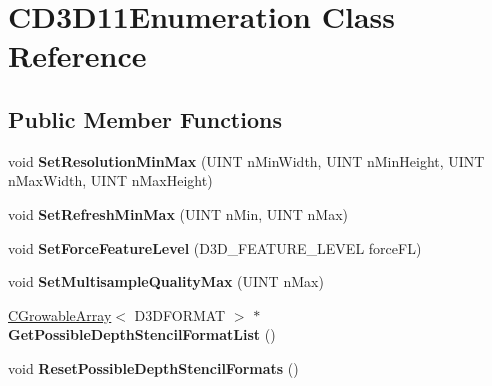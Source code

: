 \hypertarget{class_c_d3_d11_enumeration}{\section{C\+D3\+D11\+Enumeration Class Reference}
\label{class_c_d3_d11_enumeration}
}
\subsection*{Public Member Functions}
\begin{DoxyCompactItemize}
\item 
\hypertarget{class_c_d3_d11_enumeration_ac09ed1a218f19ee3147e2206e760ab58}{void {\bfseries Set\+Resolution\+Min\+Max} (U\+I\+N\+T n\+Min\+Width, U\+I\+N\+T n\+Min\+Height, U\+I\+N\+T n\+Max\+Width, U\+I\+N\+T n\+Max\+Height)}\label{class_c_d3_d11_enumeration_ac09ed1a218f19ee3147e2206e760ab58}

\item 
\hypertarget{class_c_d3_d11_enumeration_a17f92827af1e4632a2cf69c6697522d5}{void {\bfseries Set\+Refresh\+Min\+Max} (U\+I\+N\+T n\+Min, U\+I\+N\+T n\+Max)}\label{class_c_d3_d11_enumeration_a17f92827af1e4632a2cf69c6697522d5}

\item 
\hypertarget{class_c_d3_d11_enumeration_a9a63b7dac5d73edb7c695fb93c305730}{void {\bfseries Set\+Force\+Feature\+Level} (D3\+D\+\_\+\+F\+E\+A\+T\+U\+R\+E\+\_\+\+L\+E\+V\+E\+L force\+F\+L)}\label{class_c_d3_d11_enumeration_a9a63b7dac5d73edb7c695fb93c305730}

\item 
\hypertarget{class_c_d3_d11_enumeration_a193b533444d3877edb73e2648f331858}{void {\bfseries Set\+Multisample\+Quality\+Max} (U\+I\+N\+T n\+Max)}\label{class_c_d3_d11_enumeration_a193b533444d3877edb73e2648f331858}

\item 
\hypertarget{class_c_d3_d11_enumeration_a745398527d8722167feed164b6b9d437}{\hyperlink{class_c_growable_array}{C\+Growable\+Array}$<$ D3\+D\+F\+O\+R\+M\+A\+T $>$ $\ast$ {\bfseries Get\+Possible\+Depth\+Stencil\+Format\+List} ()}\label{class_c_d3_d11_enumeration_a745398527d8722167feed164b6b9d437}

\item 
\hypertarget{class_c_d3_d11_enumeration_a36fca3e79e1992d9b1d7bda6653c42fd}{void {\bfseries Reset\+Possible\+Depth\+Stencil\+Formats} ()}\label{class_c_d3_d11_enumeration_a36fca3e79e1992d9b1d7bda6653c42fd}


\end{DoxyCompactItemize}
